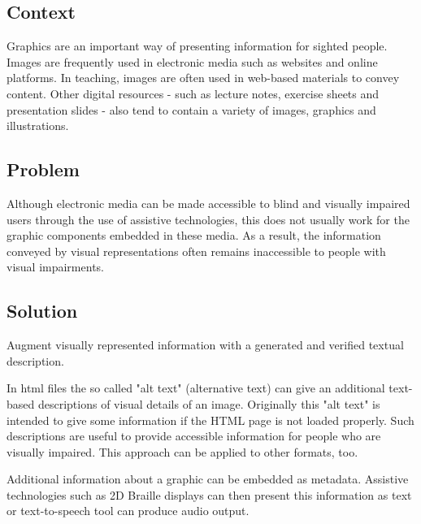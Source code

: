 \patternFive

\subsection*{Context}

Graphics are an important way of presenting information for sighted people.  
Images are frequently used in electronic media such as websites and online platforms. In teaching, images are often used in web-based materials to convey content. Other digital resources - such as lecture notes, exercise sheets and presentation slides - also tend to contain a variety of images, graphics and illustrations.
    
\subsection*{Problem}

\begin{itshape}
Although electronic media can be made accessible to blind and visually impaired users through the use of assistive technologies, this does not usually work for the graphic components embedded in these media. As a result, the information conveyed by visual representations often remains inaccessible to people with visual impairments.
\end{itshape}


\subsection*{Solution}


\begin{sol}

Augment visually represented information with a generated and verified textual description.

\end{sol}

In \ac{html} files the so called "alt text"  (alternative text) can give an additional text-based descriptions of visual details of an image. 
Originally this "alt text" is intended to give some information if the HTML page is not loaded properly. 
Such descriptions are useful to provide accessible information for people who are visually impaired. This approach can be applied to other formats, too.

Additional information about a graphic can be embedded as metadata. Assistive technologies such as 2D Braille displays can then present this information as text or text-to-speech tool can produce audio output.

